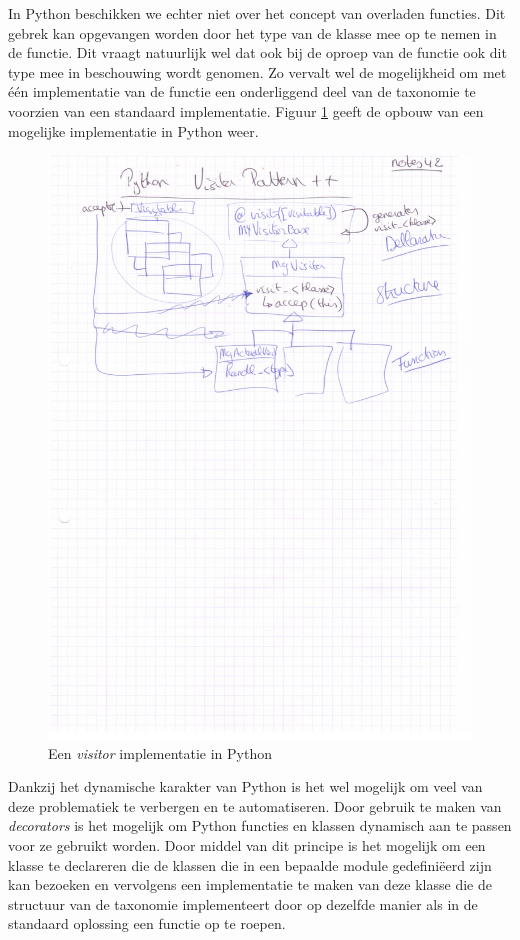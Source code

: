 In Python beschikken we echter niet over het concept van overladen functies.
Dit gebrek kan opgevangen worden door het type van de klasse mee op te nemen in
de  functie. Dit vraagt natuurlijk wel dat ook bij de oproep van de
 functie ook dit type mee in beschouwing wordt genomen. Zo
vervalt wel de mogelijkheid om met \'e\'en implementatie van de functie een
onderliggend deel van de taxonomie te voorzien van een standaard implementatie.
Figuur \ref{fig:py-visitor} geeft de opbouw van een mogelijke implementatie in
Python weer.

\begin{figure}[ht]
  \centering
  \includegraphics[width=0.77\linewidth]{resources/py-visitor.pdf}
  \caption{Een \emph{visitor} implementatie in Python}
  \label{fig:py-visitor}
\end{figure}

Dankzij het dynamische karakter van Python is het wel mogelijk om veel
van deze problematiek te verbergen en te automatiseren. Door gebruik te maken
van \emph{decorators} is het mogelijk om Python functies en klassen dynamisch
aan te passen voor ze gebruikt worden. Door middel van dit principe is het
mogelijk om een klasse te declareren die de klassen die in een bepaalde module
gedefini\"eerd zijn kan bezoeken en vervolgens een implementatie te maken van
deze klasse die de structuur van de taxonomie implementeert door op dezelfde
manier als in de standaard oplossing een  functie op te roepen.

